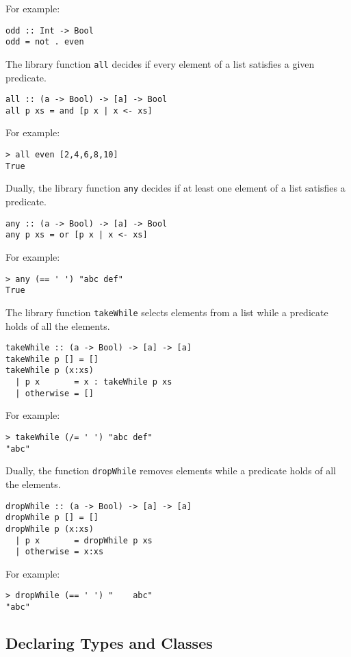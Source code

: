 \begin{multicols}{2}
For example:
\begin{lstlisting}
odd :: Int -> Bool
odd = not . even
\end{lstlisting}

The library function \lstinline{all} decides if every element of a list satisfies a given predicate.
\begin{lstlisting}
all :: (a -> Bool) -> [a] -> Bool
all p xs = and [p x | x <- xs]
\end{lstlisting}

For example:
\begin{lstlisting}
> all even [2,4,6,8,10]
True
\end{lstlisting}

Dually, the library function \lstinline{any} decides if at least one element of a list satisfies a predicate.
\begin{lstlisting}
any :: (a -> Bool) -> [a] -> Bool
any p xs = or [p x | x <- xs]
\end{lstlisting}

For example:
\begin{lstlisting}
> any (== ' ') "abc def"
True
\end{lstlisting}

The library function \lstinline{takeWhile} selects elements from a list while a predicate holds of all the elements.
\begin{lstlisting}
takeWhile :: (a -> Bool) -> [a] -> [a]
takeWhile p [] = []
takeWhile p (x:xs)
  | p x       = x : takeWhile p xs
  | otherwise = []
\end{lstlisting}

For example:
\begin{lstlisting}
> takeWhile (/= ' ') "abc def"
"abc"
\end{lstlisting}

Dually, the function \lstinline{dropWhile} removes elements while a predicate holds of all the elements.
\begin{lstlisting}
dropWhile :: (a -> Bool) -> [a] -> [a]
dropWhile p [] = []
dropWhile p (x:xs)
  | p x       = dropWhile p xs
  | otherwise = x:xs
\end{lstlisting}

For example:
\begin{lstlisting}
> dropWhile (== ' ') "    abc"
"abc"
\end{lstlisting}


\subsection{Declaring Types and Classes}

\end{multicols}
